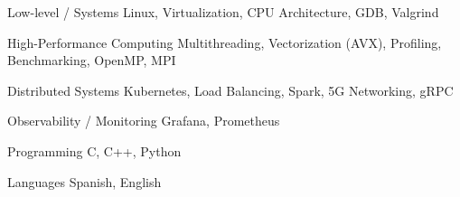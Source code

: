 

\begin{cvskills}
  \cvskill
    {Low-level / Systems} %
    {Linux, Virtualization, CPU Architecture, GDB, Valgrind}  %

  \cvskill
    {High-Performance Computing}
    {Multithreading, Vectorization (AVX), Profiling, Benchmarking, OpenMP, MPI} %

  \cvskill
    {Distributed Systems} %
    {Kubernetes, Load Balancing, Spark, 5G Networking, gRPC} %

  \cvskill
    {Observability / Monitoring} %
    {Grafana, Prometheus} %

  \cvskill
    {Programming} %
    {C, C++, Python} %

  \cvskill
    {Languages} %
    {Spanish, English} %

\end{cvskills}
